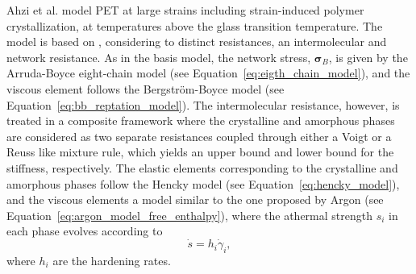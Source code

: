 
Ahzi et al. \citep{ahziModelingDeformationBehavior2003} model PET at large strains including strain-induced polymer crystallization, at temperatures above the glass transition temperature.
The model is based on \citep{boyceConstitutiveModelFinite2000}, considering to distinct resistances, an intermolecular and network resistance.
As in the basis model, the network stress, $\pmb\sigma_B$, is given by the Arruda-Boyce eight-chain model (see Equation~\eqref{eq:eigth_chain_model}), and the viscous element follows the Bergström-Boyce model (see Equation~\eqref{eq:bb_reptation_model}).
The intermolecular resistance, however, is treated in a composite framework where the crystalline and amorphous phases are considered as two separate resistances coupled through either a Voigt or a Reuss like mixture rule, which yields an upper bound and lower bound for the stiffness, respectively.
The elastic elements corresponding to the crystalline and amorphous phases follow the Hencky model (see Equation~\eqref{eq:hencky_model}), and the viscous elements a model similar to the one proposed by Argon (see Equation~\eqref{eq:argon_model_free_enthalpy}), where the athermal strength $s_i$ in each phase evolves according to
\begin{equation}
	\dot s = h_i\dot\gamma_i,
\end{equation}
where $h_i$ are the hardening rates.


